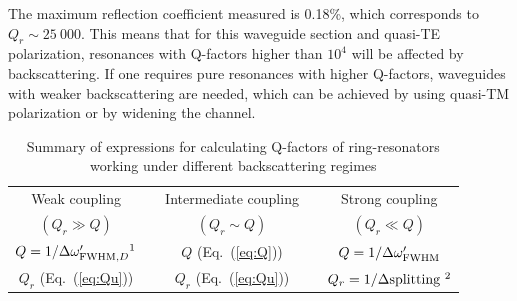 \documentclass[10pt,letterpaper]{article}
\begin{document}
The maximum reflection coefficient measured is 0.18\%, which corresponds to $Q_r \sim 25~000$. This means that for this waveguide section and quasi-TE polarization, resonances with Q-factors higher than $10^4$ will be affected by backscattering. If one requires pure resonances with higher Q-factors, waveguides with weaker backscattering are needed, which can be achieved by using quasi-TM polarization or by widening the channel.\cite{Morichetti2010b}



\begin{table}[ht]
	\renewcommand{\arraystretch}{1.3}
	\caption{Summary of expressions for calculating Q-factors of ring-resonators working under different backscattering regimes}
	\centering
	\begin{tabular}{ccccc}
	\hline
	Weak coupling && Intermediate coupling && Strong coupling\\
	$(Q_r \gg Q)$ && $(Q_r \sim Q)$ && $(Q_r \ll Q)$\\
	\cline{1-1} \cline{3-3} \cline{5-5}
	$Q=1/\Delta\omega'_{\mbox{\scriptsize{FWHM}},D}\footnotemark[1]$&&$Q$ (Eq.~(\ref{eq:Q}))&&$Q=1/\Delta\omega'_{\mbox{\scriptsize{FWHM}}}$\\
	$Q_r$ (Eq.~(\ref{eq:Qu}))&&$Q_r$ (Eq.~(\ref{eq:Qu}))&&$Q_r=1/\Delta\mbox{splitting   }\footnotemark[2]$\\

\end{tabular}
\end{table}
\end{document}
